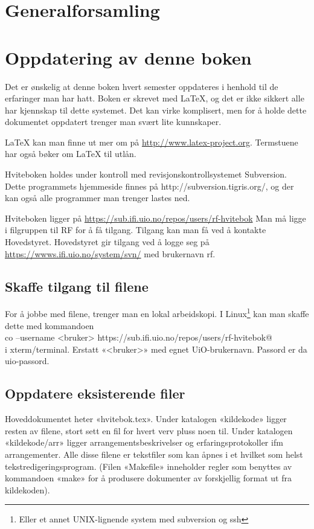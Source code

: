 \documentclass[11pt,norsk,a4paper,pointlessnumbers]{scrbook}
\begin{document}
\chapter{Generalforsamling}


\appendix

\chapter{Oppdatering av denne boken}
Det er ønskelig at denne boken hvert semester oppdateres i henhold til
de erfaringer man har hatt. Boken er skrevet med \LaTeX, og det er ikke
sikkert alle har kjennskap til dette systemet. Det kan virke komplisert,
men for å holde dette dokumentet oppdatert trenger man svært lite
kunnskaper.

\LaTeX{} kan man finne ut mer om på \url{http://www.latex-project.org}. Termstuene
har også bøker om \LaTeX{} til utlån.

Hviteboken holdes under kontroll med revisjonskontrollsystemet Subversion.
Dette programmets hjemmeside finnes på http://subversion.tigris.org/, og
der kan også alle programmer man trenger lastes ned.

Hviteboken ligger på \url{https://sub.ifi.uio.no/repos/users/rf-hvitebok}
Man må ligge i filgruppen til RF for å få tilgang. Tilgang kan man få ved å 
kontakte Hovedstyret. Hovedstyret gir tilgang ved å logge seg på 
\url{https://wwws.ifi.uio.no/system/svn/} med brukernavn rf.

\section{Skaffe tilgang til filene}
For å jobbe med filene, trenger man en lokal arbeidskopi. I Linux\footnote{Eller et annet UNIX-lignende system med subversion og ssh} kan man
skaffe dette med kommandoen\\
\verb@svn co --username <bruker> https://sub.ifi.uio.no/repos/users/rf-hvitebok@\\
i xterm/terminal. Erstatt «<bruker>» med egnet UiO-brukernavn. Passord er da uio-passord.

\section{Oppdatere eksisterende filer}
Hoveddokumentet heter «hvitebok.tex». Under katalogen «kildekode» ligger
resten av filene, stort sett en fil for hvert verv pluss noen til.
Under katalogen «kildekode/arr» ligger arrangementsbeskrivelser og
erfaringsprotokoller ifm arrangementer. Alle disse filene er tekstfiler
som kan åpnes i et hvilket som helst tekstredigeringsprogram.
(Filen «Makefile» inneholder regler som benyttes av kommandoen «make»
for å produsere dokumenter av forskjellig format ut fra kildekoden).
\end{document}
